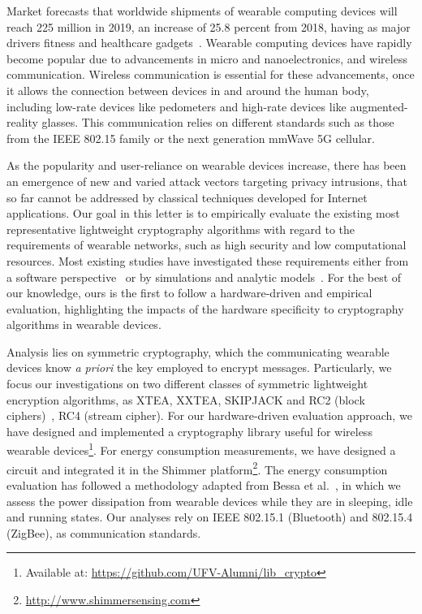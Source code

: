 Market forecasts that worldwide shipments of wearable computing devices will reach 225 million in 2019, an increase of 25.8 percent from 2018, having as major drivers
fitness and healthcare gadgets~\cite{Li:2018}. 
Wearable computing devices have rapidly become popular due to advancements in micro and nanoelectronics, and 
wireless communication. Wireless communication is essential for these advancements, once it allows the connection between devices in and around the human body, including low-rate devices like pedometers and high-rate devices like augmented-reality glasses. This communication relies on different standards such as 
those from the IEEE 802.15 family 
or the next generation mmWave 5G cellular. 

As the popularity and user-reliance on wearable devices increase, there has been an emergence of new and varied attack vectors targeting privacy intrusions, that so far cannot be addressed by classical techniques developed for Internet applications. Our goal in this letter is to empirically evaluate the existing most representative lightweight cryptography algorithms with regard to 
the requirements of wearable networks, such as high security and low computational resources. Most existing studies have investigated these requirements either from a software perspective~\cite{eisenbarth2012compact,kerckhof2012towards,eisenbarth2007survey} or by simulations and analytic models~\cite{cazorla2013survey,el2017equalized}. For the best of our knowledge, ours is the first to follow a hardware-driven and empirical evaluation, highlighting the impacts of the hardware specificity to cryptography algorithms in wearable devices.

Analysis lies on symmetric cryptography, which the communicating wearable devices know {\em a priori} the key employed to encrypt messages. 
Particularly, we focus our investigations on two different classes of symmetric lightweight 
encryption algorithms, as XTEA, XXTEA, SKIPJACK and RC2 (block ciphers)~\cite{Moh:2015}, RC4 (stream cipher). 
For our hardware-driven evaluation approach, we have designed and implemented a cryptography library useful for wireless wearable devices\footnote{Available at: \url{https://github.com/UFV-Alumni/lib_crypto}}. For energy consumption measurements, we have designed a circuit and integrated it in the Shimmer platform\footnote{\url{http://www.shimmersensing.com}}.  
The energy consumption evaluation has followed a methodology adapted from Bessa et al.~\cite{bessa2017jetsonleap}, in which 
we assess the power dissipation from wearable devices while they are in sleeping, idle and running states. 
Our analyses rely on IEEE 802.15.1 (Bluetooth) and 802.15.4 (ZigBee), as communication standards. 

